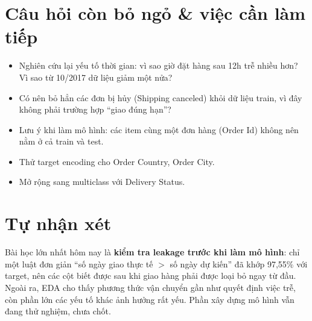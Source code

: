 \documentclass[11pt,a4paper]{article}
\newcommand{\col}[1]{\textsf{#1}}
\begin{document}
\section{Câu hỏi còn bỏ ngỏ \& việc cần làm tiếp}
\begin{itemize}
  \item[$\square$] Nghiên cứu lại yếu tố thời gian: vì sao giờ đặt hàng sau 12h trễ nhiều hơn? Vì sao từ 10/2017 dữ liệu giảm một nửa?
  \item[$\square$] Có nên bỏ hẳn các đơn bị hủy (Shipping canceled) khỏi dữ liệu train, vì đây không phải trường hợp ``giao đúng hạn''?
  \item[$\square$] Lưu ý khi làm mô hình: các item cùng một đơn hàng (\col{Order Id}) không nên nằm ở cả train và test.
  \item[$\square$] Thử target encoding cho \col{Order Country}, \col{Order City}.
  \item[$\square$] Mở rộng sang multiclass với \col{Delivery Status}.
\end{itemize}

\section{Tự nhận xét}
Bài học lớn nhất hôm nay là \textbf{kiểm tra leakage trước khi làm mô hình}: chỉ một luật đơn giản
``số ngày giao thực tế $>$ số ngày dự kiến'' đã khớp 97,55\% với target, nên các cột biết được sau khi giao hàng
phải được loại bỏ ngay từ đầu. Ngoài ra, EDA cho thấy phương thức vận chuyển gần như quyết định việc trễ, còn
phần lớn các yếu tố khác ảnh hưởng rất yếu. Phần xây dựng mô hình vẫn đang thử nghiệm, chưa chốt.
\end{document}
